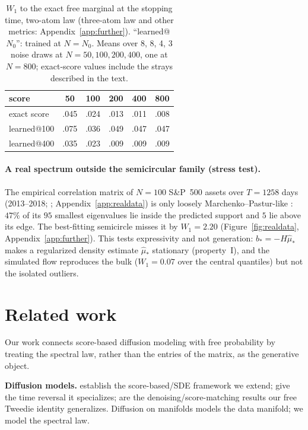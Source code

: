 \documentclass[11pt]{article}
\theoremstyle{plain}
\theoremstyle{definition}
\theoremstyle{remark}
\begin{document}
\begin{table}[h]
\centering
\caption{$W_1$ to the exact free marginal at the stopping time, two-atom law (three-atom law and other metrics: Appendix~\ref{app:further}). ``learned@$N_0$'': trained at $N=N_0$. Means over 8, 8, 4, 3 noise draws at $N=50,100,200,400$, one at $N=800$; exact-score values include the strays described in the text.}
\label{tab:crossn}
\footnotesize
\setlength{\tabcolsep}{3.5pt}
\begin{tabular}{@{}lccccc@{}}
\toprule
score & 50 & 100 & 200 & 400 & 800\\
\midrule
exact score & .045 & .024 & .013 & .011 & .008\\
learned@100 & .075 & .036 & .049 & .047 & .047\\
learned@400 & .035 & .023 & .009 & .009 & .009\\
\bottomrule
\end{tabular}
\end{table}

\paragraph{A real spectrum outside the semicircular family (stress test).} The empirical correlation matrix of
$N=100$ S\&P~500 assets over $T=1258$ days (2013--2018; \citealp{plotlydatasets}; Appendix~\ref{app:realdata}) is only
loosely Marchenko--Pastur-like \citep{Laloux1999,Plerou2002,Bun2017}: $47\%$ of its $95$ smallest eigenvalues lie inside the
predicted support and $5$ lie above its edge. The best-fitting semicircle misses it by $W_1=2.20$ (Figure~\ref{fig:realdata},
Appendix~\ref{app:further}). This tests expressivity and not generation: $b_*=-H\hat\mu_*$ makes a regularized density estimate
$\hat\mu_*$ stationary (property~I), and the simulated flow reproduces the bulk ($W_1=0.07$ over the central quantiles) but not the
isolated outliers.

\section{Related work}\label{sec:related}

Our work connects score-based diffusion modeling with free probability by treating the spectral law, rather
than the entries of the matrix, as the generative object.

\textbf{Diffusion models.} \citet{SohlDickstein2015,Ho2020,Song2021} establish the score-based/SDE
framework we extend; \citet{Anderson1982,Haussmann1986} give the time reversal it specializes;
\citet{Vincent2011,Hyvarinen2005} are the denoising/score-matching results our free Tweedie
identity generalizes. Diffusion on manifolds \citep{DeBortoli2022,Huang2022} models the data
manifold; we model the spectral law.
\end{document}
